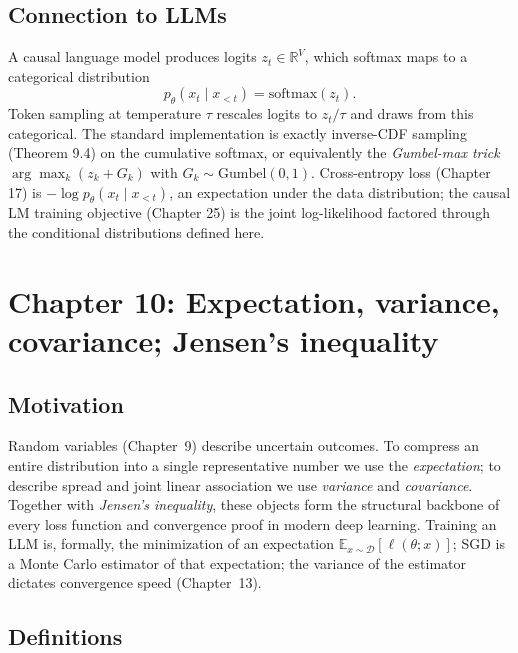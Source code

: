 \documentclass[11pt]{article}
\theoremstyle{remark}
\begin{document}
\subsection*{Connection to LLMs}

A causal language model produces logits $z_t \in \mathbb{R}^V$, which softmax maps to a categorical distribution
\[
p_\theta(x_t \mid x_{<t}) = \mathrm{softmax}(z_t).
\]
Token sampling at temperature $\tau$ rescales logits to $z_t/\tau$ and draws from this categorical. The standard implementation is exactly inverse-CDF sampling (Theorem 9.4) on the cumulative softmax, or equivalently the \emph{Gumbel-max trick} $\arg\max_k(z_k + G_k)$ with $G_k \sim \mathrm{Gumbel}(0,1)$. Cross-entropy loss (Chapter 17) is $-\log p_\theta(x_t\mid x_{<t})$, an expectation under the data distribution; the causal LM training objective (Chapter 25) is the joint log-likelihood factored through the conditional distributions defined here.


\section*{Chapter 10: Expectation, variance, covariance; Jensen's inequality}

\subsection*{Motivation}

Random variables (Chapter~9) describe uncertain outcomes. To compress an entire distribution into a single representative number we use the \emph{expectation}; to describe spread and joint linear association we use \emph{variance} and \emph{covariance}. Together with \emph{Jensen's inequality}, these objects form the structural backbone of every loss function and convergence proof in modern deep learning. Training an LLM is, formally, the minimization of an expectation $\mathbb{E}_{x\sim\mathcal{D}}[\ell(\theta;x)]$; SGD is a Monte Carlo estimator of that expectation; the variance of the estimator dictates convergence speed (Chapter~13).

\subsection*{Definitions}
\end{document}
